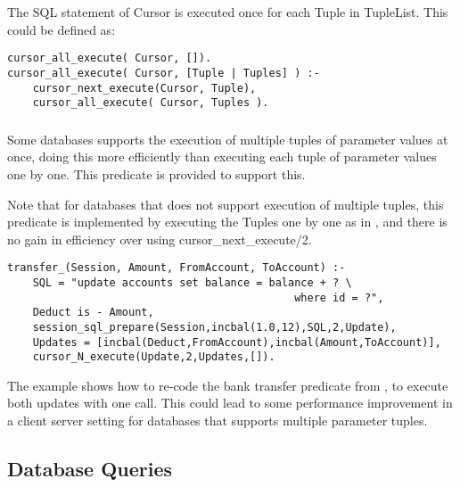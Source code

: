 The SQL statement of Cursor is executed once for each Tuple in 
TupleList. This could be defined as:
\begin{verbatim}
cursor_all_execute( Cursor, []).
cursor_all_execute( Cursor, [Tuple | Tuples] ) :-
    cursor_next_execute(Cursor, Tuple),
    cursor_all_execute( Cursor, Tuples ).
\end{verbatim}

\subsubsection
{}
\label{cursor-N-execute/4}

Some databases supports the execution of multiple tuples of parameter values at
once, doing this more efficiently than executing each tuple of parameter
values one by one. This predicate is provided to support this. 

Note that for databases that does not support execution of multiple tuples, this
predicate is implemented by executing the Tuples one by one as in 
,
and there is no gain in efficiency over using cursor_next_execute/2.

\begin{verbatim}
transfer_(Session, Amount, FromAccount, ToAccount) :-
    SQL = "update accounts set balance = balance + ? \
                                             where id = ?",
    Deduct is - Amount,
    session_sql_prepare(Session,incbal(1.0,12),SQL,2,Update),
    Updates = [incbal(Deduct,FromAccount),incbal(Amount,ToAccount)],
    cursor_N_execute(Update,2,Updates,[]).
\end{verbatim}

The example shows how to re-code the bank transfer predicate from
,
to execute
both updates with one call. This could lead to some performance
improvement in a client server setting for databases that supports multiple
parameter tuples.

\subsection{Database Queries}

